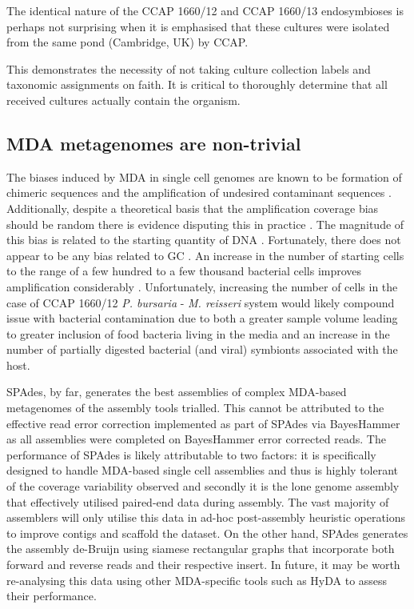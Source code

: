 The identical nature of the CCAP 1660/12 and CCAP 1660/13 endosymbioses is perhaps not surprising
when it is emphasised that these cultures were isolated from the same
pond (Cambridge, UK) by CCAP. 

This demonstrates the necessity of not taking culture collection labels and taxonomic
assignments on faith. It is critical to thoroughly determine that all received
cultures actually contain the organism.

\subsection{MDA metagenomes are non-trivial}

The biases induced by MDA in single cell genomes are known to be 
formation of chimeric sequences and the amplification
of undesired contaminant sequences \citep{Binga2008}.
Additionally, despite a theoretical basis that
the amplification coverage bias should be random \citep{Hosono2003}
there is evidence disputing this in practice \citep{Ellegaard2013}.
The magnitude of this bias is related to the starting
quantity of DNA \citep{Ellegaard2013a}.
Fortunately, there does not appear to be any bias
related to GC \citep{Ellegaard2013a}.
An increase in the number of starting cells to the range of
a few hundred to a few thousand bacterial cells
improves amplification considerably \citep{Ellegaard2013a}. 
Unfortunately, increasing the number of cells in the case
of CCAP 1660/12 \textit{P. bursaria} - \textit{M. reisseri} system
would likely compound issue with bacterial contamination due 
to both a greater sample volume leading to greater inclusion
of food bacteria living in the media and an increase in the
number of partially digested bacterial (and viral) symbionts
associated with the host. 

SPAdes, by far, generates the best assemblies of complex
MDA-based metagenomes of the assembly tools trialled. 
This cannot be attributed to the effective read error correction
implemented as part of SPAdes via BayesHammer as all assemblies
were completed on BayesHammer error corrected reads. The performance
of SPAdes is likely attributable to two factors: it is specifically
designed to handle MDA-based single cell assemblies and thus is 
highly tolerant of the coverage variability observed and secondly
it is the lone genome assembly that effectively utilised
paired-end data during assembly.  The vast majority of assemblers
will only utilise this data in ad-hoc post-assembly heuristic operations
to improve contigs and scaffold the dataset.  On the other hand,
SPAdes generates the assembly de-Bruijn using siamese rectangular
graphs that incorporate both forward and reverse reads and their 
respective insert. 
In future, it may be worth re-analysing this data using
other MDA-specific tools such as HyDA to assess their performance. 

